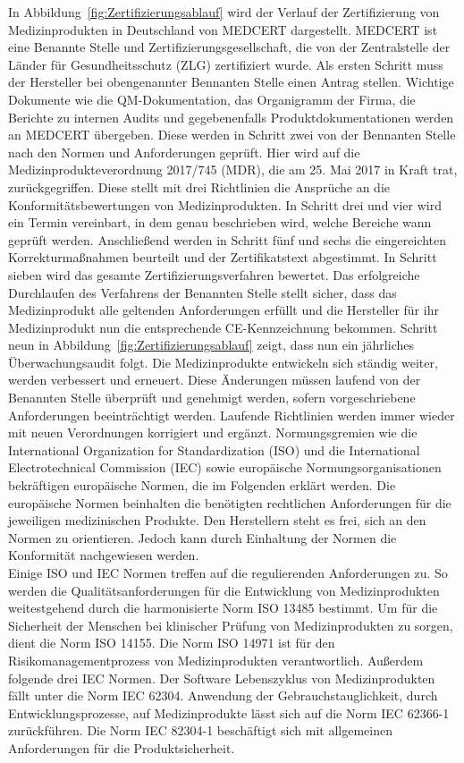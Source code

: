 In Abbildung~\ref{fig:Zertifizierungsablauf} wird der Verlauf der Zertifizierung von Medizinprodukten in Deutschland von MEDCERT dargestellt.
MEDCERT ist eine Benannte Stelle und Zertifizierungsgesellschaft,
die von der Zentralstelle der Länder für Gesundheitsschutz (ZLG) zertifiziert wurde\cite{Marktzugangsregelung}.
Als ersten Schritt muss der Hersteller bei obengenannter Bennanten Stelle einen Antrag stellen. Wichtige Dokumente wie die QM-Dokumentation,
das Organigramm der Firma,
die Berichte zu internen Audits und gegebenenfalls Produktdokumentationen werden an MEDCERT übergeben.
Diese werden in Schritt zwei von der Bennanten Stelle nach den Normen und Anforderungen geprüft.
Hier wird auf die Medizinprodukteverordnung 2017/745 (MDR), die am 25. Mai 2017 in Kraft trat, zurückgegriffen\cite{Produkteverordnung}.
Diese stellt mit drei Richtlinien  die Ansprüche an die Konformitätsbewertungen von Medizinprodukten.
In Schritt drei und vier wird ein Termin vereinbart, in dem genau beschrieben wird, welche Bereiche wann geprüft werden.
Anschließend werden in Schritt fünf und sechs die eingereichten Korrekturmaßnahmen beurteilt und der Zertifikatstext abgestimmt.
In Schritt sieben wird das gesamte Zertifizierungsverfahren bewertet.
Das erfolgreiche Durchlaufen des Verfahrens der Benannten Stelle stellt sicher,
dass das Medizinprodukt alle geltenden Anforderungen erfüllt
und die Hersteller für ihr Medizinprodukt nun die entsprechende CE-Kennzeichnung bekommen\cite{AI_in_EU}.
Schritt neun in Abbildung~\ref{fig:Zertifizierungsablauf} zeigt, dass nun ein jährliches Überwachungsaudit folgt.
Die Medizinprodukte entwickeln sich ständig weiter, werden verbessert und erneuert. 
Diese Änderungen müssen laufend von der Benannten Stelle überprüft und genehmigt werden,
sofern vorgeschriebene Anforderungen beeinträchtigt werden.
Laufende Richtlinien werden immer wieder mit neuen Verordnungen korrigiert und ergänzt. 
Normungsgremien wie die International Organization for Standardization (ISO) und die International Electrotechnical Commission (IEC) sowie europäische Normungsorganisationen bekräftigen europäische Normen, die im Folgenden erklärt werden. 
Die europäische Normen beinhalten die benötigten rechtlichen Anforderungen für die jeweiligen medizinischen Produkte. Den Herstellern steht es frei, sich an den Normen zu orientieren. Jedoch kann durch Einhaltung der Normen die Konformität nachgewiesen werden\cite{AI_in_EU}.\\
Einige ISO und IEC Normen treffen auf die regulierenden Anforderungen zu.
So werden die Qualitätsanforderungen für die Entwicklung von Medizinprodukten weitestgehend durch die harmonisierte Norm ISO 13485 bestimmt\cite{iso13485}. 
Um für die Sicherheit der Menschen bei klinischer Prüfung von Medizinprodukten zu sorgen, dient die Norm ISO 14155\cite{iso14155}.
Die Norm ISO 14971 ist für den Risikomanagementprozess von Medizinprodukten verantwortlich\cite{iso14971}.
Außerdem folgende drei IEC Normen.
Der Software Lebenszyklus von Medizinprodukten fällt unter die Norm IEC 62304\cite{iec62304}. 
Anwendung der Gebrauchstauglichkeit, durch Entwicklungsprozesse,
auf Medizinprodukte lässt sich auf die Norm IEC 62366-1 zurückführen\cite{iec623661}. 
Die Norm IEC 82304-1 beschäftigt sich mit allgemeinen Anforderungen für die Produktsicherheit\cite{iec823041}.